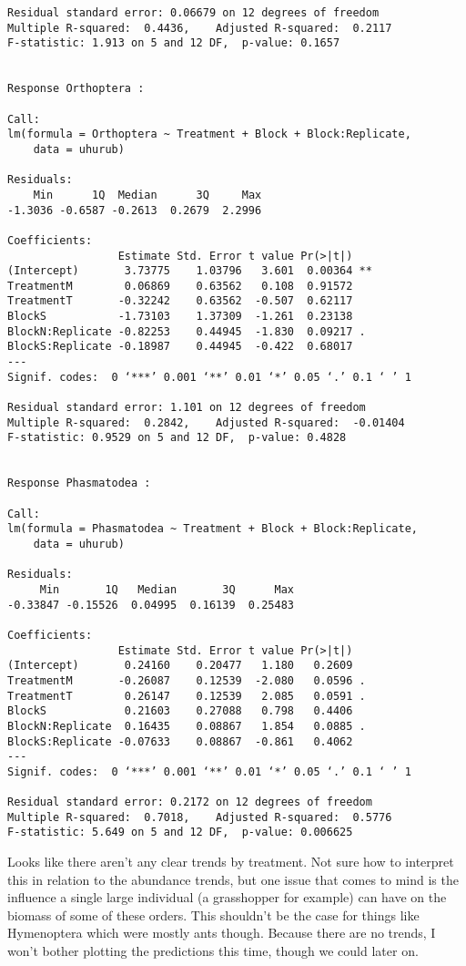 \documentclass[11pt]{article}
\begin{document}
\begin{verbatim}
Residual standard error: 0.06679 on 12 degrees of freedom
Multiple R-squared:  0.4436,	Adjusted R-squared:  0.2117 
F-statistic: 1.913 on 5 and 12 DF,  p-value: 0.1657


Response Orthoptera :

Call:
lm(formula = Orthoptera ~ Treatment + Block + Block:Replicate, 
    data = uhurub)

Residuals:
    Min      1Q  Median      3Q     Max 
-1.3036 -0.6587 -0.2613  0.2679  2.2996 

Coefficients:
                 Estimate Std. Error t value Pr(>|t|)   
(Intercept)       3.73775    1.03796   3.601  0.00364 **
TreatmentM        0.06869    0.63562   0.108  0.91572   
TreatmentT       -0.32242    0.63562  -0.507  0.62117   
BlockS           -1.73103    1.37309  -1.261  0.23138   
BlockN:Replicate -0.82253    0.44945  -1.830  0.09217 . 
BlockS:Replicate -0.18987    0.44945  -0.422  0.68017   
---
Signif. codes:  0 ‘***’ 0.001 ‘**’ 0.01 ‘*’ 0.05 ‘.’ 0.1 ‘ ’ 1

Residual standard error: 1.101 on 12 degrees of freedom
Multiple R-squared:  0.2842,	Adjusted R-squared:  -0.01404 
F-statistic: 0.9529 on 5 and 12 DF,  p-value: 0.4828


Response Phasmatodea :

Call:
lm(formula = Phasmatodea ~ Treatment + Block + Block:Replicate, 
    data = uhurub)

Residuals:
     Min       1Q   Median       3Q      Max 
-0.33847 -0.15526  0.04995  0.16139  0.25483 

Coefficients:
                 Estimate Std. Error t value Pr(>|t|)  
(Intercept)       0.24160    0.20477   1.180   0.2609  
TreatmentM       -0.26087    0.12539  -2.080   0.0596 .
TreatmentT        0.26147    0.12539   2.085   0.0591 .
BlockS            0.21603    0.27088   0.798   0.4406  
BlockN:Replicate  0.16435    0.08867   1.854   0.0885 .
BlockS:Replicate -0.07633    0.08867  -0.861   0.4062  
---
Signif. codes:  0 ‘***’ 0.001 ‘**’ 0.01 ‘*’ 0.05 ‘.’ 0.1 ‘ ’ 1

Residual standard error: 0.2172 on 12 degrees of freedom
Multiple R-squared:  0.7018,	Adjusted R-squared:  0.5776 
F-statistic: 5.649 on 5 and 12 DF,  p-value: 0.006625
\end{verbatim}

Looks like there aren't any clear trends by treatment. Not sure how to interpret this in relation to the abundance trends, but one issue that comes to mind is the influence a single large individual (a grasshopper for example) can have on the biomass of some of these orders. This shouldn't be the case for things like Hymenoptera which were mostly ants though. Because there are no trends, I won't bother plotting the predictions this time, though we could later on.
\end{document}
